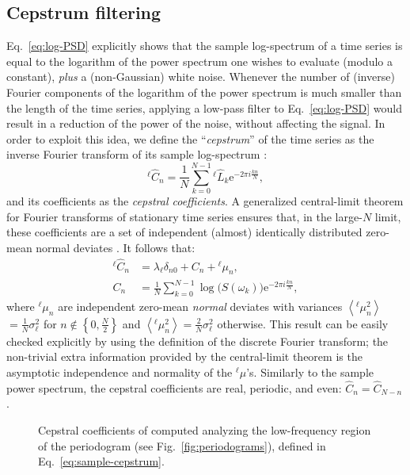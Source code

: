 \subsection{Cepstrum filtering}
Eq.~\eqref{eq:log-PSD} explicitly shows that the sample log-spectrum of a time series is equal to the logarithm of the power spectrum one wishes to evaluate (modulo a constant), \emph{plus} a (non-Gaussian) white noise. Whenever the number of (inverse) Fourier components of the logarithm of the power spectrum is much smaller than the length of the time series, applying a low-pass filter to Eq.~\eqref{eq:log-PSD} would result in a reduction of the power of the noise, without affecting the signal. 
In order to exploit this idea, we define the ``\emph{cepstrum}'' of the time series as the inverse Fourier transform of its sample log-spectrum \citep{Childers1977}:
\begin{equation}
  ^{\ell\!} \hat C_{n} = \frac{1}{N}\sum_{k=0}^{N-1} {^{\ell\!} \hat L_{k}} \mathrm{e}^{-2\pi i\frac{kn}{N}}, \label{eq:sample-cepstrum}
\end{equation}
and its coefficients as the \emph{cepstral coefficients}. 
A generalized central-limit theorem for Fourier transforms of stationary time series ensures that, in the large-$N$ limit, these coefficients are a set of independent (almost) identically distributed zero-mean normal deviates \citep{Anderson1994,Peligrad2010}. It follows that:
\begin{align}
    ^{\ell\!} \hat  C_{n} &= \lambda_{\ell} \delta_{n0} + C_{n} +  {^{{\ell\!}}{\mu}}_{n},  \label{eq:cepstrogram}\\
    C_{n} &= \frac{1}{N}\sum_{k=0}^{N-1} \log\bigl (S(\omega_k) \bigr ) \mathrm{e}^{-2\pi i\frac{kn}{N}}, \label{eq:C-nohat}
\end{align}
where $^{{\ell\!}}{\mu}_{n}$ are independent zero-mean \emph{normal} deviates with variances $\left\langle {^{{\ell\!}}{\mu}_{n}^2}  \right\rangle$ $=\frac{1}{N}\sigma_\ell^2$ for $n\notin\left\{ 0,\frac{N}{2}\right\}$ and $\left\langle ^{{\ell\!}}{\mu}_{n}^{2}\right\rangle =\frac{2}{N}\sigma_{\ell}^{2}$
otherwise.
This result can be easily checked explicitly by using the definition of the discrete Fourier transform; the non-trivial extra information provided by the central-limit theorem is the asymptotic independence and normality of the $^{\ell}\mu$'s. Similarly to the sample power spectrum, the cepstral coefficients are real, periodic, and even: $\hat C_{n} = \hat C_{N-n}$. 

\begin{figure}[!tb]
    \centering
    \caption{Cepstral coefficients of  computed analyzing the low-frequency region of the periodogram (see Fig.~\ref{fig:periodograms}), defined in Eq.~\eqref{eq:sample-cepstrum}. }
    \label{fig:cepstrums}
\end{figure}

